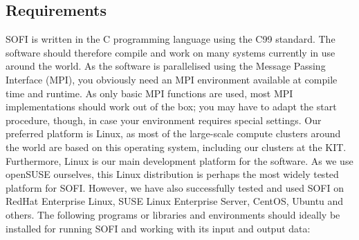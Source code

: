 \documentclass[11pt,english,a4paper]{article}
\begin{document}
\subsection{Requirements}
\label{requirements}
SOFI is written in the C programming language using the C99 standard. The software should therefore compile and work on many systems currently in use around the world. As the software is parallelised using the Message Passing Interface (MPI), you obviously need an MPI environment available at compile time and runtime. As only basic MPI functions are used, most MPI implementations should work out of the box; you may have to adapt the start procedure, though, in case your environment requires special settings. Our preferred platform is Linux, as most of the large-scale compute clusters around the world are based on this operating system, including our clusters at the KIT. Furthermore, Linux is our main development platform for the software. As we use openSUSE ourselves, this Linux distribution is perhaps the most widely tested platform for SOFI. However, we have also successfully tested and used SOFI on RedHat Enterprise Linux, SUSE Linux Enterprise Server, CentOS, Ubuntu and others. The following programs or libraries and environments should ideally be installed for running SOFI and working with its input and output data:
\end{document}
